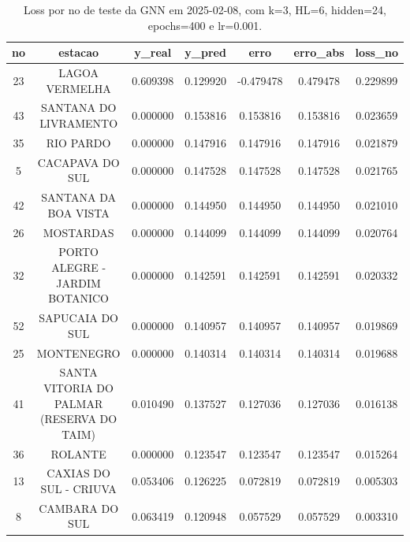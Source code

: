\begin{table}[h]
\centering
\caption{Loss por no de teste da GNN em 2025-02-08, com k=3, HL=6, hidden=24, epochs=400 e lr=0.001.}
\label{tab:gnn_loss_k3_hl6_h24_e400_d20250208}
\begin{tabular}{ccccccc}
\toprule
no & estacao & y\_real & y\_pred & erro & erro\_abs & loss\_no \\
\midrule
23 & LAGOA VERMELHA & 0.609398 & 0.129920 & -0.479478 & 0.479478 & 0.229899 \\
43 & SANTANA DO LIVRAMENTO & 0.000000 & 0.153816 & 0.153816 & 0.153816 & 0.023659 \\
35 & RIO PARDO & 0.000000 & 0.147916 & 0.147916 & 0.147916 & 0.021879 \\
5 & CACAPAVA DO SUL & 0.000000 & 0.147528 & 0.147528 & 0.147528 & 0.021765 \\
42 & SANTANA DA BOA VISTA & 0.000000 & 0.144950 & 0.144950 & 0.144950 & 0.021010 \\
26 & MOSTARDAS & 0.000000 & 0.144099 & 0.144099 & 0.144099 & 0.020764 \\
32 & PORTO ALEGRE - JARDIM BOTANICO & 0.000000 & 0.142591 & 0.142591 & 0.142591 & 0.020332 \\
52 & SAPUCAIA DO SUL & 0.000000 & 0.140957 & 0.140957 & 0.140957 & 0.019869 \\
25 & MONTENEGRO & 0.000000 & 0.140314 & 0.140314 & 0.140314 & 0.019688 \\
41 & SANTA VITORIA DO PALMAR (RESERVA DO TAIM) & 0.010490 & 0.137527 & 0.127036 & 0.127036 & 0.016138 \\
36 & ROLANTE & 0.000000 & 0.123547 & 0.123547 & 0.123547 & 0.015264 \\
13 & CAXIAS DO SUL - CRIUVA & 0.053406 & 0.126225 & 0.072819 & 0.072819 & 0.005303 \\
8 & CAMBARA DO SUL & 0.063419 & 0.120948 & 0.057529 & 0.057529 & 0.003310 \\
\bottomrule
\end{tabular}
\end{table}

